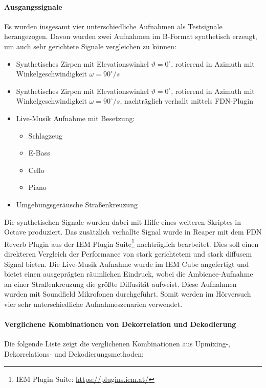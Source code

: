 \paragraph{Ausgangssignale}
Es wurden insgesamt vier unterschiedliche Aufnahmen als Testsignale herangezogen. Davon wurden zwei Aufnahmen im B-Format synthetisch erzeugt, um auch sehr gerichtete Signale vergleichen zu können:

\begin{itemize}
	\item Synthetisches Zirpen mit Elevationswinkel $\vartheta=0^{\circ}$, rotierend in Azimuth mit Winkelgeschwindigkeit $\omega=90^{\circ}/s$
	\item Synthetisches Zirpen mit Elevationswinkel $\vartheta=0^{\circ}$, rotierend in Azimuth mit Winkelgeschwindigkeit $\omega=90^{\circ}/s$, nachträglich verhallt mittels FDN-Plugin
	\item Live-Musik Aufnahme mit Besetzung:
	\begin{itemize}
	  \item Schlagzeug
	  \item E-Bass
	  \item Cello
	  \item Piano
	\end{itemize}
	\item Umgebungsgeräusche Straßenkreuzung
\end{itemize}

Die synthetischen Signale wurden dabei mit Hilfe eines weiteren Skriptes in Octave produziert. Das zusätzlich verhallte Signal wurde in Reaper mit dem FDN Reverb Plugin aus der IEM Plugin Suite\footnote{IEM Plugin Suite: \url{https://plugins.iem.at/}} nachträglich bearbeitet. Dies soll einen direkteren Vergleich der Performance von stark gerichtetem und stark diffusem Signal bieten. Die Live-Musik Aufnahme wurde im IEM Cube angefertigt und bietet einen ausgeprägten räumlichen Eindruck, wobei die Ambience-Aufnahme an einer Straßenkreuzung die größte Diffusität aufweist. Diese Aufnahmen wurden mit Soundfield Mikrofonen durchgeführt. Somit werden im Hörversuch vier sehr unterschiedliche Aufnahmeszenarien verwendet.


\paragraph{Verglichene Kombinationen von Dekorrelation und Dekodierung}

Die folgende Liste zeigt die verglichenen Kombinationen aus Upmixing-, Dekorrelations- und Dekodierungsmethoden:

